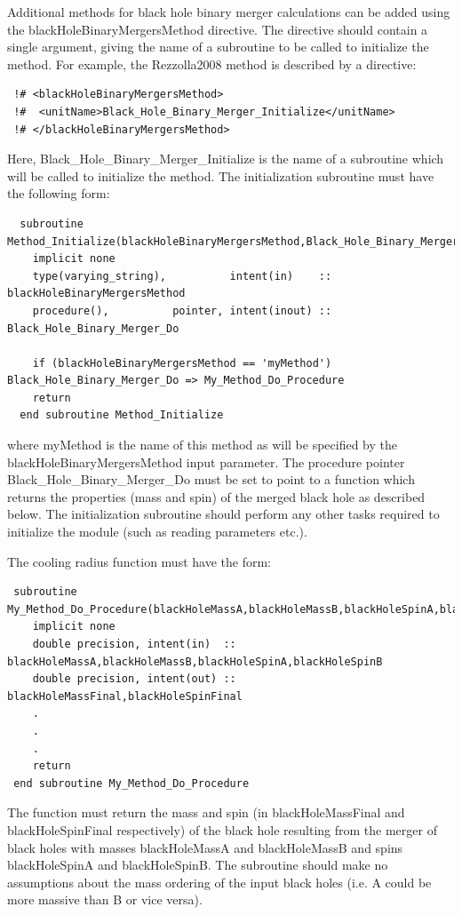 Additional methods for black hole binary merger calculations can be added using the {\normalfont \ttfamily blackHoleBinaryMergersMethod} directive. The directive should contain a single argument, giving the name of a subroutine to be called to initialize the method. For example, the {\normalfont \ttfamily Rezzolla2008} method is described by a directive:
\begin{verbatim}
 !# <blackHoleBinaryMergersMethod>
 !#  <unitName>Black_Hole_Binary_Merger_Initialize</unitName>
 !# </blackHoleBinaryMergersMethod>
\end{verbatim}
Here, {\normalfont \ttfamily Black\_Hole\_Binary\_Merger\_Initialize} is the name of a subroutine which will be called to initialize the method. The initialization subroutine must have the following form:
\begin{verbatim}
  subroutine Method_Initialize(blackHoleBinaryMergersMethod,Black_Hole_Binary_Merger_Do)
    implicit none
    type(varying_string),          intent(in)    :: blackHoleBinaryMergersMethod
    procedure(),          pointer, intent(inout) :: Black_Hole_Binary_Merger_Do
    
    if (blackHoleBinaryMergersMethod == 'myMethod') Black_Hole_Binary_Merger_Do => My_Method_Do_Procedure
    return
  end subroutine Method_Initialize
\end{verbatim}
where {\normalfont \ttfamily myMethod} is the name of this method as will be specified by the {\normalfont \ttfamily blackHoleBinaryMergersMethod} input parameter. The procedure pointer {\normalfont \ttfamily Black\_Hole\_Binary\_Merger\_Do} must be set to point to a function which returns the properties (mass and spin) of the merged black hole as described below. The initialization subroutine should perform any other tasks required to initialize the module (such as reading parameters etc.).

The cooling radius function must have the form:
\begin{verbatim}
 subroutine My_Method_Do_Procedure(blackHoleMassA,blackHoleMassB,blackHoleSpinA,blackHoleSpinB,blackHoleMassFinal,blackHoleSpinFinal)
    implicit none
    double precision, intent(in)  :: blackHoleMassA,blackHoleMassB,blackHoleSpinA,blackHoleSpinB
    double precision, intent(out) :: blackHoleMassFinal,blackHoleSpinFinal
    .
    .
    .
    return
 end subroutine My_Method_Do_Procedure
\end{verbatim}
The function must return the mass and spin (in {\normalfont \ttfamily blackHoleMassFinal} and {\normalfont \ttfamily blackHoleSpinFinal} respectively) of the black hole resulting from the merger of black holes with masses {\normalfont \ttfamily blackHoleMassA} and {\normalfont \ttfamily blackHoleMassB} and spins {\normalfont \ttfamily blackHoleSpinA} and {\normalfont \ttfamily blackHoleSpinB}. The subroutine should make no assumptions about the mass ordering of the input black holes (i.e. A could be more massive than B or vice versa).


